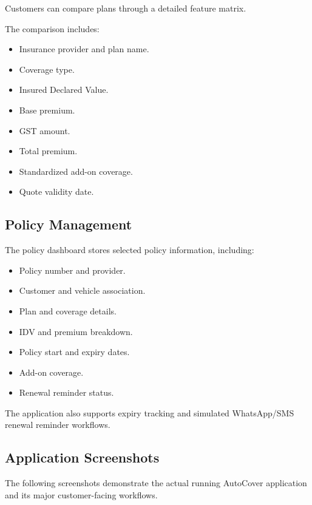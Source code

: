 \documentclass[11pt,a4paper]{article}
\begin{document}
Customers can compare plans through a detailed feature matrix.

The comparison includes:

\begin{itemize}
    \item Insurance provider and plan name.
    \item Coverage type.
    \item Insured Declared Value.
    \item Base premium.
    \item GST amount.
    \item Total premium.
    \item Standardized add-on coverage.
    \item Quote validity date.
\end{itemize}

\subsection{Policy Management}

The policy dashboard stores selected policy information,
including:

\begin{itemize}
    \item Policy number and provider.
    \item Customer and vehicle association.
    \item Plan and coverage details.
    \item IDV and premium breakdown.
    \item Policy start and expiry dates.
    \item Add-on coverage.
    \item Renewal reminder status.
\end{itemize}

The application also supports expiry tracking and simulated
WhatsApp/SMS renewal reminder workflows.

\subsection{Application Screenshots}

The following screenshots demonstrate the actual running
AutoCover application and its major customer-facing workflows.
\end{document}
